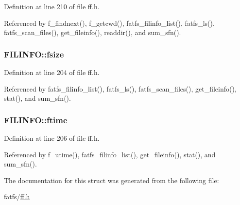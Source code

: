 Definition at line 210 of file ff.\+h.



Referenced by f\+\_\+findnext(), f\+\_\+getcwd(), fatfs\+\_\+filinfo\+\_\+list(), fatfs\+\_\+ls(), fatfs\+\_\+scan\+\_\+files(), get\+\_\+fileinfo(), readdir(), and sum\+\_\+sfn().

\subsubsection[{\texorpdfstring{fsize}{fsize}}]{ F\+I\+L\+I\+N\+F\+O\+::fsize}\hypertarget{structFILINFO_a9e5b78ed7190f73de3ebcbdfbd6d1844}{}\label{structFILINFO_a9e5b78ed7190f73de3ebcbdfbd6d1844}


Definition at line 204 of file ff.\+h.



Referenced by fatfs\+\_\+filinfo\+\_\+list(), fatfs\+\_\+ls(), fatfs\+\_\+scan\+\_\+files(), get\+\_\+fileinfo(), stat(), and sum\+\_\+sfn().

\subsubsection[{\texorpdfstring{ftime}{ftime}}]{ F\+I\+L\+I\+N\+F\+O\+::ftime}\hypertarget{structFILINFO_ae0f751b79621bf7b29669f177bbe6b9a}{}\label{structFILINFO_ae0f751b79621bf7b29669f177bbe6b9a}


Definition at line 206 of file ff.\+h.



Referenced by f\+\_\+utime(), fatfs\+\_\+filinfo\+\_\+list(), get\+\_\+fileinfo(), stat(), and sum\+\_\+sfn().



The documentation for this struct was generated from the following file\+:\begin{DoxyCompactItemize}
\item 
fatfs/\hyperlink{ff_8h}{ff.\+h}\end{DoxyCompactItemize}
